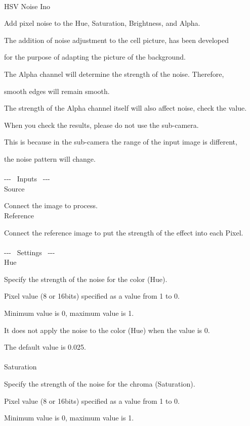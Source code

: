 \documentclass[a4paper,12pt]{article}
\begin{document}
\thispagestyle{empty}

\Large
\noindent \\
HSV Noise Ino\medskip
\par
\normalsize
Add pixel noise to the Hue, Saturation, Brightness, and Alpha.\par
The addition of noise adjustment to the cell picture, has been developed\par
for the purpose of adapting the picture of the background.\\
\par
The Alpha channel will determine the strength of the noise. Therefore,\par
smooth edges will remain smooth.\par
The strength of the Alpha channel itself will also affect noise, check the value.\\
\par
When you check the results, please do not use the sub-camera.\par
This is because in the sub-camera the range of the input image is different,\par
the noise pattern will change.\\
\\
-{-}- \ Inputs \ -{-}-\\
Source\par
Connect the image to process.\\
Reference\par
Connect the reference image to put the strength of the effect into each Pixel.\\
\\
-{-}- \ Settings \ -{-}-\\
Hue\par
Specify the strength of the noise for the color (Hue).\par
Pixel value (8 or 16bits) specified as a value from 1 to 0.\par
Minimum value is 0, maximum value is 1.\par
It does not apply the noise to the color (Hue) when the value is 0.\par
The default value is 0.025.\\
\\
Saturation\par
Specify the strength of the noise for the chroma (Saturation).\par
Pixel value (8 or 16bits) specified as a value from 1 to 0.\par
Minimum value is 0, maximum value is 1.\par
\end{document}
